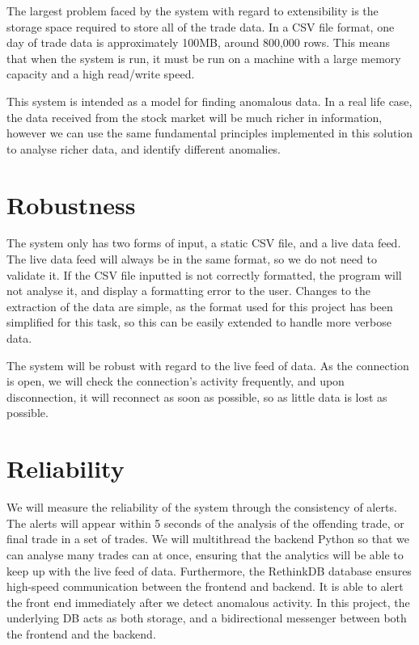 \documentclass[11pt, oneside, a4paper]{article}
\begin{document}
The largest problem faced by the system with regard to extensibility is the storage
space required to store all of the trade data. In a CSV file format, one day of
trade data is approximately 100MB, around 800,000 rows. This means that when the
system is run, it must be run on a machine with a large memory capacity and a high
read/write speed.

This system is intended as a model for finding anomalous data. In a real life case,
the data received from the stock market will be much richer in information, however
we can use the same fundamental principles implemented in this solution to analyse
richer data, and identify different anomalies.

\section{Robustness}
The system only has two forms of input, a static CSV file, and a live data feed.
The live data feed will always be in the same format, so we do not need to validate
it. If the CSV file inputted is not correctly formatted, the program will not analyse
it, and display a formatting error to the user. Changes to the extraction of the
data are simple, as the format used for this project has been simplified for this
task, so this can be easily extended to handle more verbose data.

The system will be robust with regard to the live feed of data. As the connection
is open, we will check the connection’s activity frequently, and upon disconnection,
it will reconnect as soon as possible, so as little data is lost as possible.

\section{Reliability}
We will measure the reliability of the system through the consistency of alerts.
The alerts will appear within 5 seconds of the analysis of the offending trade,
or final trade in a set of trades. We will multithread the backend Python so that
we can analyse many trades can at once, ensuring that the analytics will be able
to keep up with the live feed of data. Furthermore, the RethinkDB database ensures
high-speed communication between the frontend and backend. It is able to alert the
front end immediately after we detect anomalous activity. In this project, the
underlying DB acts as both storage, and a bidirectional messenger between both the
frontend and the backend.
\end{document}
